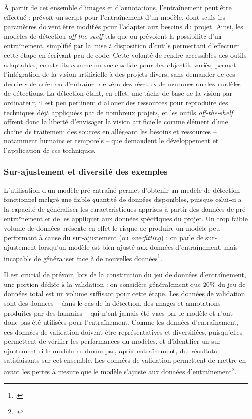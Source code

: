 	À partir de cet ensemble d'images et d'annotations, l'entraînement peut être effectué : \yolov prévoit un script pour l'entraînement d'un modèle, dont seuls les paramètres doivent être modifiés pour l'adapter aux besoins du projet. Ainsi, les modèles de détection \textit{off-the-shelf} tels que \yolo ou \docex prévoient la possibilité d'un entraînement, simplifié par la mise à disposition d'outils permettant d'effectuer cette étape en écrivant peu de code. Cette volonté de rendre accessibles des outils adaptables, construits comme un socle solide pour des objectifs variés, permet l'intégration de la vision artificielle à des projets divers, sans demander de ces derniers de créer ou d'entraîner de zéro des réseaux de neurones ou des modèles de détections. La détection étant, en effet, une tâche de base de la vision par ordinateur, il est peu pertinent d'allouer des ressources pour reproduire des techniques déjà appliquées par de nombreux projets, et les outils \textit{off-the-shelf} offrent donc la liberté d'envisager la vision artificielle comme élément d'une chaîne de traitement des sources en allégeant les besoins et ressources -- notamment humains et temporels -- que demandent le développement et l'application de ces techniques. 

    \subsubsection{Sur-ajustement et diversité des exemples}
	L'utilisation d'un modèle pré-entraîné permet d'obtenir un modèle de détection fonctionnel malgré une faible quantité de données disponibles, puisque celui-ci a la capacité de généraliser les caractéristiques apprises à partir des données de pré-entraînement et de les appliquer aux données spécifiques du projet. Un trop faible volume de données présente en effet le risque de produire un modèle peu performant à cause du sur-ajustement (ou \textit{overfitting}) : on parle de sur-ajustement lorsqu'un modèle est bien ajusté aux données d'entraînement, mais incapable de généraliser face à de nouvelles données\footcite{cholletApprentissageProfondAvec2020a}. 
	
	Il est crucial de prévoir, lors de la constitution du jeu de données d'entraînement, une portion dédiée à la validation : on considère généralement que 20\% du jeu de données total est un volume suffisant pour cette étape. Les données de validation sont des données -- dans le cas de la détection, des images et annotations produites par des humains -- qui n'ont jamais été vues par le modèle et n'ont donc pas été utilisées pour l'entraînement. Comme les données d'entraînement, ces données de validation doivent être représentatives et diversifiées, puisqu'elles permettent de vérifier les performances du modèles, et d'identifier un sur-ajustement si le modèle ne donne pas, après entraînement, des résultats satisfaisants sur cet ensemble. Les données de validation permettent de mettre en avant les pertes à mesure que le modèle s'ajuste aux données d'entraînement\footcite{carremansHandlingOverfittingDeep2019}.
	
